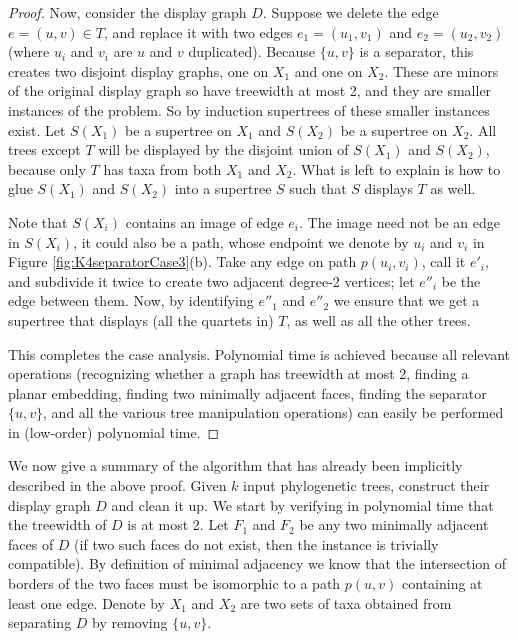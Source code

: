 \begin{proof}
Now, consider the display graph $D$. Suppose we delete the edge $e=(u,v) \in T$, and replace it with two edges $e_1=(u_1,v_1)$ and $e_2=(u_2,v_2)$ (where $u_i$ and $v_i$ are $u$ and $v$ duplicated). Because $\{u,v\}$ is a separator, this creates two disjoint display graphs, one on $X_1$ and one on $X_2$. These are minors of the original display graph so have treewidth at most 2, and they are smaller instances of the problem. So by induction supertrees of these smaller instances exist. Let $S(X_1)$ be a supertree on $X_1$ and $S(X_2)$ be a supertree on $X_2$. All trees except $T$ will be displayed by the disjoint union of $S(X_1)$ and $S(X_2)$, because only $T$ has taxa from both $X_1$ and $X_2$. What is left to explain is how to glue $S(X_1)$ and $S(X_2)$ into a supertree $S$ such that $S$ displays $T$ as well. 

Note that $S(X_i)$ contains an image of edge $e_i$. The image need not be an edge in $S(X_i)$, it could also be a path, whose endpoint we denote by $u_i$ and $v_i$ in Figure \ref{fig:K4separatorCase3}(b). Take any edge on path $p(u_i, v_i)$, call it $e'_i$, and subdivide it twice to create two adjacent degree-2 vertices; let $e''_i$ be the edge between them. Now, by identifying $e''_1$ and $e''_2$ we ensure that we get a supertree that displays (all the quartets in) $T$, as well as all the other trees.

This completes the case analysis. Polynomial time is achieved because all relevant operations (recognizing whether a graph has treewidth at most 2, finding a planar embedding, finding two minimally adjacent faces, finding the separator $\{u,v\}$, and
all the various tree manipulation operations) can easily be performed in (low-order) polynomial time.
\end{proof}


We now give a summary of the algorithm that has already been implicitly described in the above proof. Given $k$ input phylogenetic trees, construct their display graph $D$ and clean it up. We start by verifying in polynomial time that the treewidth of $D$ is at most 2. Let $F_1$ and $F_2$ be any two minimally adjacent faces of $D$ (if two such faces do not exist, then the instance is trivially compatible). By definition of minimal adjacency we know that the intersection of borders of the two faces must be isomorphic to a path $p(u,v)$ containing at least one edge. Denote by $X_1$ and $X_2$ are two sets of taxa obtained from separating $D$ by removing $\{u,v\}$. 

